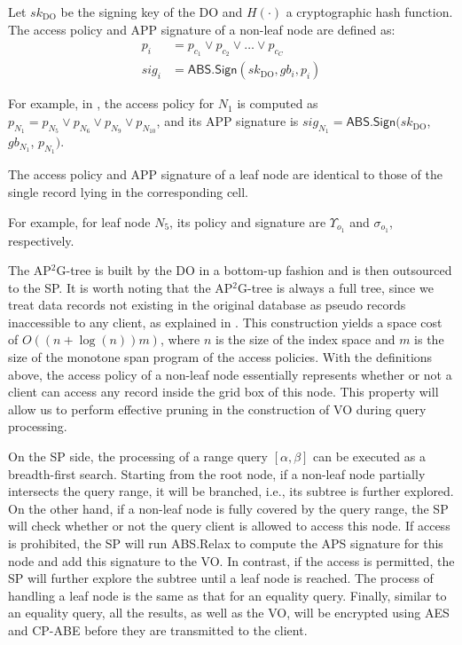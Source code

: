 \begin{definition}
  Let ${sk}_{\textrm{DO}}$ be the signing key of the DO and $H(\cdot)$ a cryptographic hash function. The access policy and APP signature of a non-leaf node are defined as:
  \begin{align*}
    p_i   & = p_{c_1}  \lor  p_{c_2}  \lor  \dots  \lor  p_{c_C} \\
    sig_i & = \textsf{ABS.Sign}({sk}_{\textrm{DO}}, gb_i , p_i)
  \end{align*}
\end{definition}
For example, in , the access policy for $N_1$ is computed as $p_{N_1} = p_{N_5} \lor p_{N_6} \lor p_{N_9} \lor p_{N_{10}}$, and its APP signature is $sig_{N_1} = \textsf{ABS.Sign}({sk}_{\textrm{DO}}$, $gb_{N_1}$, $p_{N_1})$.

\begin{definition}
  The access policy and APP signature of a leaf node are identical to those of the single record lying in the corresponding cell.
\end{definition}
For example, for leaf node $N_5$, its policy and signature are $\Upsilon_{o_1}$ and $\sigma_{o_1}$, respectively.

The AP$^2$G-tree is built by the DO in a bottom-up fashion and is then outsourced to the SP\@.
It is worth noting that the AP$^2$G-tree is always a full tree, since we treat data records not existing in the original database as pseudo records inaccessible to any client, as explained in . This construction yields a space cost of $O((n + \log(n))m)$, where $n$ is the size of the index  space and $m$ is the size of the monotone span program of the access policies. With the definitions above, the access policy of a non-leaf node essentially represents whether or not a client can access any record inside the grid box of this node. This property will allow us to perform effective pruning in the construction of VO during query processing.

On the SP side, the processing of a range query $[\alpha,\beta]$ can be executed as a breadth-first search. Starting from the root node, if a non-leaf node partially intersects the query range, it will be branched, i.e., its subtree is further explored. On the other hand, if a non-leaf node is fully covered by the query range, the SP will check whether or not the query client is allowed to access this node. If  access is prohibited, the SP will run \textsf{ABS.Relax} to compute the APS signature for this node and add this signature to the VO\@. In contrast, if the access is permitted, the SP will further explore the subtree until a leaf node is reached. The process of handling a leaf node is the same as that for an equality query. Finally, similar to an equality query, all the results, as well as the VO, will be encrypted using AES and CP-ABE before they are transmitted to the client.

